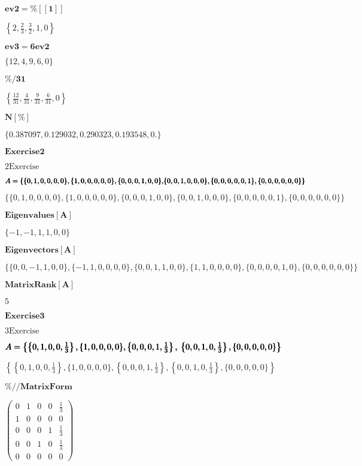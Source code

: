\documentclass{article}
\begin{document}
\noindent\(\pmb{\text{ev2}=\%[[1]]}\)

\noindent\(\left\{2,\frac{2}{3},\frac{3}{2},1,0\right\}\)

\noindent\(\pmb{\text{ev3}=6\text{ev2}}\)

\noindent\(\{12,4,9,6,0\}\)

\noindent\(\pmb{\%/31}\)

\noindent\(\left\{\frac{12}{31},\frac{4}{31},\frac{9}{31},\frac{6}{31},0\right\}\)

\noindent\(\pmb{N[\%]}\)

\noindent\(\{0.387097,0.129032,0.290323,0.193548,0.\}\)

\noindent\(\pmb{\text{Exercise} 2}\)

\noindent\(2 \text{Exercise}\)

\noindent\(\pmb{A=\{\{0,1,0,0,0,0\},\{1,0,0,0,0,0\},\{0,0,0,1,0,0\},}\\
\pmb{\{0,0,1,0,0,0\},\{0,0,0,0,0,1\},\{0,0,0,0,0,0\}\}}\)

\noindent\(\{\{0,1,0,0,0,0\},\{1,0,0,0,0,0\},\{0,0,0,1,0,0\},\{0,0,1,0,0,0\},\{0,0,0,0,0,1\},\{0,0,0,0,0,0\}\}\)

\noindent\(\pmb{\text{Eigenvalues}[A]}\)

\noindent\(\{-1,-1,1,1,0,0\}\)

\noindent\(\pmb{\text{Eigenvectors}[A]}\)

\noindent\(\{\{0,0,-1,1,0,0\},\{-1,1,0,0,0,0\},\{0,0,1,1,0,0\},\{1,1,0,0,0,0\},\{0,0,0,0,1,0\},\{0,0,0,0,0,0\}\}\)

\noindent\(\pmb{\text{MatrixRank}[A]}\)

\noindent\(5\)

\noindent\(\pmb{\text{Exercise} 3}\)

\noindent\(3 \text{Exercise}\)

\noindent\(\pmb{A=\left\{\left\{0,1,0,0,\frac{1}{3}\right\},\{1,0,0,0,0\},\left\{0,0,0,1,\frac{1}{3}\right\},\right.}\\
\pmb{\left.\left\{0,0,1,0,\frac{1}{3}\right\},\{0,0,0,0,0\}\right\}}\)

\noindent\(\left\{\left\{0,1,0,0,\frac{1}{3}\right\},\{1,0,0,0,0\},\left\{0,0,0,1,\frac{1}{3}\right\},\left\{0,0,1,0,\frac{1}{3}\right\},\{0,0,0,0,0\}\right\}\)

\noindent\(\pmb{\%\text{//}\text{MatrixForm}}\)

\noindent\(\left(
\begin{array}{ccccc}
 0 & 1 & 0 & 0 & \frac{1}{3} \\
 1 & 0 & 0 & 0 & 0 \\
 0 & 0 & 0 & 1 & \frac{1}{3} \\
 0 & 0 & 1 & 0 & \frac{1}{3} \\
 0 & 0 & 0 & 0 & 0
\end{array}
\right)\)
\end{document}

